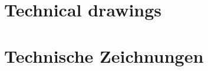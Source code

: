 \cleardoublepage
\ifdocenglish
    \chapter{Technical drawings}
\else
    \chapter{Technische Zeichnungen}
\fi

\label{app:Technische_Zeichnungen}

